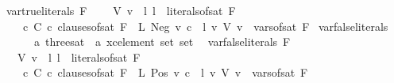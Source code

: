 {{\isachardoublequoteopen}var{\isacharunderscore}{\kern0pt}true{\isacharunderscore}{\kern0pt}literals\ F\ {\isacharequal}{\kern0pt}\ \isanewline
\ \ {\isacharbraceleft}{\kern0pt}{\isacharbraceleft}{\kern0pt}V\ v{\isacharbraceright}{\kern0pt}\ {\isasymunion}\ {\isacharbraceleft}{\kern0pt}l{\isachardot}{\kern0pt}\ l\ {\isasymin}\ {\isacharparenleft}{\kern0pt}literals{\isacharunderscore}{\kern0pt}of{\isacharunderscore}{\kern0pt}sat\ F{\isacharparenright}{\kern0pt}\ \isanewline
\ \ {\isasymand}\ {\isacharparenleft}{\kern0pt}{\isasymexists}c{\isachardot}{\kern0pt}\ C\ c{\isasymin}\ {\isacharparenleft}{\kern0pt}clauses{\isacharunderscore}{\kern0pt}of{\isacharunderscore}{\kern0pt}sat\ F{\isacharparenright}{\kern0pt}\ {\isasymand}\ L\ {\isacharparenleft}{\kern0pt}Neg\ v{\isacharparenright}{\kern0pt}\ c\ {\isacharequal}{\kern0pt}\ l{\isacharparenright}{\kern0pt}{\isacharbraceright}{\kern0pt}\ {\isacharbar}{\kern0pt}v{\isachardot}{\kern0pt}\ V\ v\ {\isasymin}\ {\isacharparenleft}{\kern0pt}vars{\isacharunderscore}{\kern0pt}of{\isacharunderscore}{\kern0pt}sat\ F{\isacharparenright}{\kern0pt}{\isacharbraceright}{\kern0pt}{\isachardoublequoteclose}\isanewline
\isanewline
{}\isamarkupfalse%
\ var{\isacharunderscore}{\kern0pt}false{\isacharunderscore}{\kern0pt}literals\isanewline
\ \ \ \ {\isacharcolon}{\kern0pt}{\isacharcolon}{\kern0pt}\ {\isachardoublequoteopen}{\isacharprime}{\kern0pt}a\ three{\isacharunderscore}{\kern0pt}sat\ {\isasymRightarrow}\ {\isacharprime}{\kern0pt}a\ xc{\isacharunderscore}{\kern0pt}element\ set\ set{\isachardoublequoteclose}\ \ \isanewline
{\isachardoublequoteopen}var{\isacharunderscore}{\kern0pt}false{\isacharunderscore}{\kern0pt}literals\ F\ {\isacharequal}{\kern0pt}\ \isanewline
\ \ {\isacharbraceleft}{\kern0pt}{\isacharbraceleft}{\kern0pt}V\ v{\isacharbraceright}{\kern0pt}\ {\isasymunion}\ {\isacharbraceleft}{\kern0pt}l{\isachardot}{\kern0pt}\ l\ {\isasymin}\ {\isacharparenleft}{\kern0pt}literals{\isacharunderscore}{\kern0pt}of{\isacharunderscore}{\kern0pt}sat\ F{\isacharparenright}{\kern0pt}\ \isanewline
\ \ {\isasymand}\ {\isacharparenleft}{\kern0pt}{\isasymexists}c{\isachardot}{\kern0pt}\ C\ c{\isasymin}\ {\isacharparenleft}{\kern0pt}clauses{\isacharunderscore}{\kern0pt}of{\isacharunderscore}{\kern0pt}sat\ F{\isacharparenright}{\kern0pt}\ {\isasymand}\ L\ {\isacharparenleft}{\kern0pt}Pos\ v{\isacharparenright}{\kern0pt}\ c\ {\isacharequal}{\kern0pt}\ l{\isacharparenright}{\kern0pt}{\isacharbraceright}{\kern0pt}\ {\isacharbar}{\kern0pt}v{\isachardot}{\kern0pt}\ V\ v\ {\isasymin}\ {\isacharparenleft}{\kern0pt}vars{\isacharunderscore}{\kern0pt}of{\isacharunderscore}{\kern0pt}sat\ F{\isacharparenright}{\kern0pt}{\isacharbraceright}{\kern0pt}{\isachardoublequoteclose}\isanewline
}
